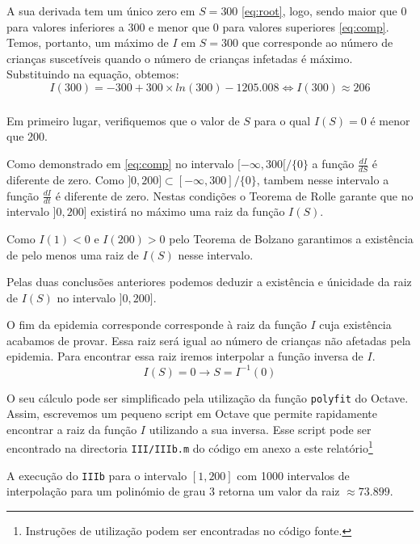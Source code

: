 \documentclass[portuguese, a4paper]{article}
\newcommand\tu[0]{\textunderscore}
\begin{document}
		A sua derivada tem um único zero em $S =
		300$ \eqref{eq:root}, logo, sendo maior que 0 para valores inferiores a 300 e menor que
		0 para valores superiores \eqref{eq:comp}.
		Temos, portanto, um máximo de $I$ em $S = 300$ que corresponde ao número de
		crianças suscetíveis quando o número de crianças infetadas é máximo.
		Substituindo na equação, obtemos:
		\begin{equation}
		I(300) = -300 + 300 \times ln(300) - 1205.008 \Leftrightarrow I(300) \approx 206
		\end{equation}

		\subsubsection{}
		Em primeiro lugar, verifiquemos que o valor de $S$ para o qual $I(S) = 0$ é menor que 200.
		\par
		Como demonstrado em \eqref{eq:comp} no intervalo $[-\infty, 300[/\{0\}$ a
		função $\frac{dI}{dS}$ é diferente de zero. Como $]0, 200] \subset
		[-\infty, 300]/\{0\}$, tambem nesse intervalo a função $\frac{dI}{dt}$
		é diferente de zero. Nestas condições o Teorema de Rolle garante que no
		intervalo $]0, 200]$ existirá no máximo uma raiz da função $I(S)$.
		\par
		Como $I(1) < 0$ e $I(200) > 0$ pelo Teorema de Bolzano garantimos a
		existência de pelo menos uma raiz de $I(S)$ nesse intervalo.
		\par
		Pelas duas conclusões anteriores podemos deduzir a existência e
		únicidade da raiz de $I(S)$ no intervalo $]0, 200]$.

		\vspace{5mm}
		\par
		O fim da epidemia corresponde corresponde à raiz da função $I$ cuja
		existência acabamos de provar. Essa raiz será igual ao número de
		crianças não afetadas pela epidemia.
		Para encontrar essa raiz iremos	interpolar a função inversa de $I$. \\
		\begin{equation}
			I(S) = 0 \rightarrow S = I^{-1}(0)
		\end{equation}
		\par O seu cálculo pode ser simplificado
		pela utilização da função \texttt{polyfit} do Octave.
		Assim, escrevemos um pequeno script em Octave que permite rapidamente
		encontrar a raiz da função $I$ utilizando a sua inversa. Esse script
		pode ser encontrado na directoria \texttt{III/III\tu b.m} do código em
		anexo a este relatório\footnote{Instruções de utilização podem ser
		encontradas no código fonte.}
		\par
		A execução do \texttt{III\tu b} para o intervalo $[1, 200]$ com 1000
		intervalos de interpolação para um polinómio de grau 3 retorna um valor
		da raiz $\approx 73.899$.
\end{document}
